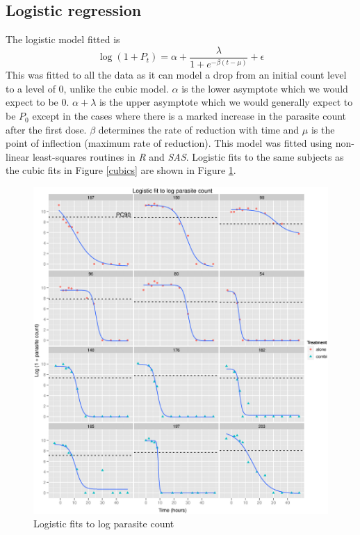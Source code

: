 \subsection{Logistic regression}
The logistic model fitted is
$$\log(1+P_t)=\alpha+\frac{\lambda}{1+e^{-\beta(t-\mu)}}+\epsilon$$
This was fitted to all the data as it can model a drop from an initial count level to a level of 0, unlike the cubic model. $\alpha$ is the lower asymptote which we would expect to be 0. $\alpha+\lambda$ is the upper asymptote which we would generally expect to be $P_0$ except in the cases where there is a marked increase in the parasite count after the first dose. $\beta$ determines the rate of reduction with time and $\mu$ is the point of inflection (maximum rate of reduction). This model was fitted using non-linear least-squares routines in \emph{R} and \emph{SAS}. Logistic fits to the same subjects as the cubic fits in Figure \ref{cubics} are shown in Figure \ref{logistics}.
\begin{figure}[p]
\includegraphics[width=6.1in]{logistics.eps} 
\caption{Logistic fits to log parasite count}\label{logistics}
\end{figure}

